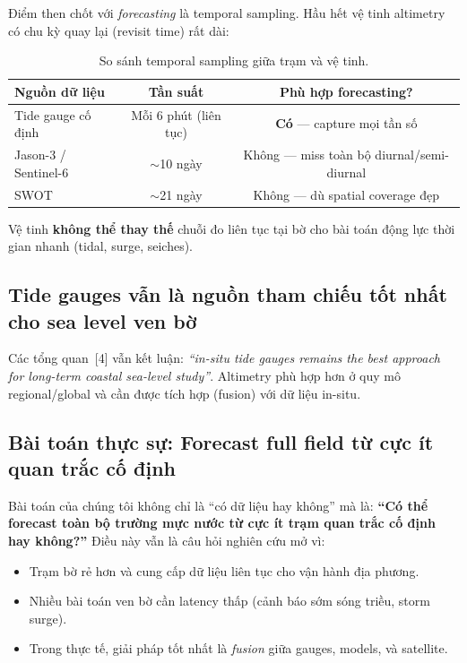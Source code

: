 \documentclass[12pt,a4paper]{article}
\begin{document}
Điểm then chốt với \emph{forecasting} là temporal sampling. Hầu hết vệ tinh altimetry có chu kỳ quay lại (revisit time) rất dài:

\begin{table}[ht]
  \centering
  \caption{So sánh temporal sampling giữa trạm và vệ tinh.}
  \label{tab:revisit}
  \begin{tabular}{@{}lcc@{}}
    \toprule
    \textbf{Nguồn dữ liệu} & \textbf{Tần suất} & \textbf{Phù hợp forecasting?} \\
    \midrule
    Tide gauge cố định & Mỗi 6 phút (liên tục) & \textbf{Có} --- capture mọi tần số \\
    Jason-3 / Sentinel-6 & $\sim$10 ngày & Không --- miss toàn bộ diurnal/semi-diurnal \\
    SWOT & $\sim$21 ngày & Không --- dù spatial coverage đẹp \\
    \bottomrule
  \end{tabular}
\end{table}

Vệ tinh \textbf{không thể thay thế} chuỗi đo liên tục tại bờ cho bài toán động lực thời gian nhanh (tidal, surge, seiches).

\subsection{Tide gauges vẫn là nguồn tham chiếu tốt nhất cho sea level ven bờ}

Các tổng quan~[4] vẫn kết luận: \emph{``in-situ tide gauges remains the best approach for long-term coastal sea-level study''}. Altimetry phù hợp hơn ở quy mô regional/global và cần được tích hợp (fusion) với dữ liệu in-situ.

\subsection{Bài toán thực sự: Forecast full field từ cực ít quan trắc cố định}

Bài toán của chúng tôi không chỉ là ``có dữ liệu hay không'' mà là: \textbf{``Có thể forecast toàn bộ trường mực nước từ cực ít trạm quan trắc cố định hay không?''} Điều này vẫn là câu hỏi nghiên cứu mở vì:
\begin{itemize}[nosep]
  \item Trạm bờ rẻ hơn và cung cấp dữ liệu liên tục cho vận hành địa phương.
  \item Nhiều bài toán ven bờ cần latency thấp (cảnh báo sớm sóng triều, storm surge).
  \item Trong thực tế, giải pháp tốt nhất là \emph{fusion} giữa gauges, models, và satellite.
\end{itemize}
\end{document}
